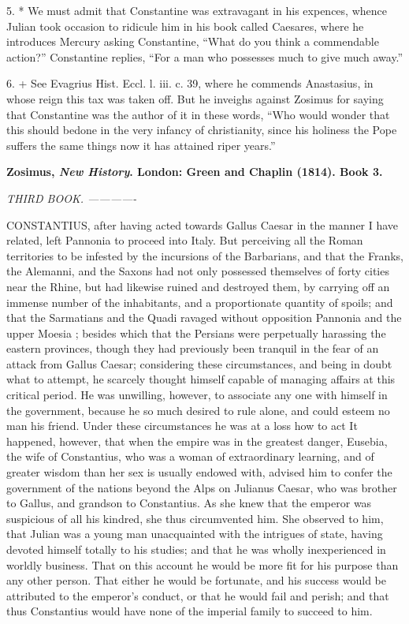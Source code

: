 5. * We must admit that Constantine was extravagant in his expences, whence Julian took occasion to ridicule him in his book called Caesares, where he introduces Mercury asking Constantine, ``What do you think a commendable action?'' Constantine replies, ``For a man who possesses much to give much away.''

6. + See Evagrius Hist. Eccl. l. iii. c. 39, where he commends Anastasius, in whose reign this tax was taken off. But he inveighs against Zosimus for saying that Constantine was the author of it in these words, ``Who would wonder that this should be\emph{}done in the very infancy of christianity, since his holiness the Pope suffers the same things now it has attained riper years.''


\textbf{Zosimus, \emph{New History}. London: Green and Chaplin
(1814). Book 3.}

\emph{THIRD BOOK. -------------}

CONSTANTIUS, after having acted towards Gallus Caesar in the manner I have related, left Pannonia to proceed into Italy. But perceiving all the Roman territories to be infested by the incursions of the Barbarians, and that the Franks, the Alemanni, and the Saxons had not only possessed themselves of forty cities near the Rhine, but had likewise ruined and destroyed them, by carrying off an immense number of the inhabitants, and a proportionate quantity of spoils; and that the Sarmatians and the Quadi ravaged without opposition Pannonia and the upper Moesia ; besides which that the Persians were perpetually harassing the eastern provinces, though they had previously been tranquil in the fear of an attack from Gallus Caesar; considering these circumstances, and being in doubt what to attempt, he scarcely thought himself capable of managing affairs at this critical period. He was unwilling, however, to associate any one with himself in the government, because he so much desired to rule alone, and could esteem no man his friend. Under these circumstances he was at a loss how to act It happened, however, that when the empire was in the greatest danger, Eusebia, the wife of Constantius, who was a woman of extraordinary learning, and of greater wisdom than her sex is usually endowed with, advised him to confer the government of the nations beyond the Alps on Julianus Caesar, who was brother to Gallus, and grandson to Constantius. As she knew that the emperor was suspicious of all his kindred, she thus circumvented him. She observed to him, that Julian was a young man unacquainted with the intrigues of state, having devoted himself totally to his studies; and that he was wholly inexperienced in worldly business. That on this account he would be more fit for his purpose than any other person. That either he would be fortunate, and his success would be attributed to the emperor's conduct, or that he would fail and perish; and that thus Constantius would have none of the imperial family to succeed to him.


